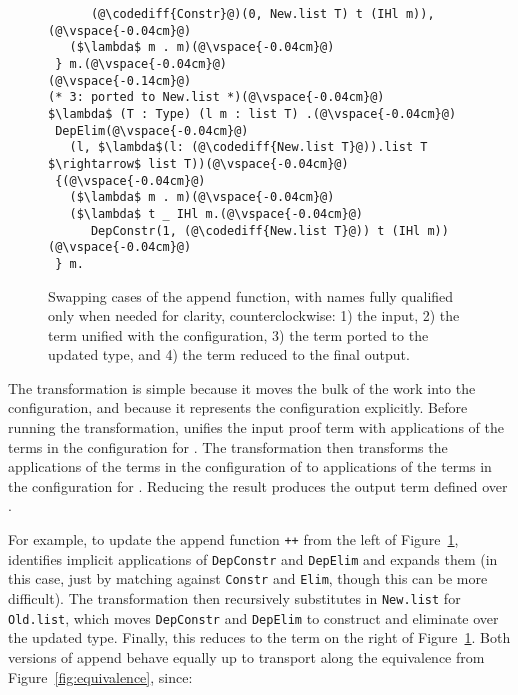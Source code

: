 \begin{figure}
\begin{minipage}{0.49\textwidth}
\begin{lstlisting}
      (@\codediff{Constr}@)(0, New.list T) t (IHl m)),(@\vspace{-0.04cm}@)
   ($\lambda$ m . m)(@\vspace{-0.04cm}@)
 } m.(@\vspace{-0.04cm}@)
(@\vspace{-0.14cm}@)
(* 3: ported to New.list *)(@\vspace{-0.04cm}@)
$\lambda$ (T : Type) (l m : list T) .(@\vspace{-0.04cm}@)
 DepElim(@\vspace{-0.04cm}@)
   (l, $\lambda$(l: (@\codediff{New.list T}@)).list T $\rightarrow$ list T))(@\vspace{-0.04cm}@)
 {(@\vspace{-0.04cm}@)
   ($\lambda$ m . m)(@\vspace{-0.04cm}@)
   ($\lambda$ t _ IHl m.(@\vspace{-0.04cm}@)
      DepConstr(1, (@\codediff{New.list T}@)) t (IHl m))(@\vspace{-0.04cm}@)
 } m.
\end{lstlisting}
\end{minipage}
\vspace{-0.3cm}
\caption{Swapping cases of the append function, with names fully qualified only when needed for clarity, counterclockwise: 1) the input, 2) the term unified with the configuration, 3) the term ported to the updated type, and 4) the term reduced to the final output.}
\label{fig:appswap1}
\end{figure}

The transformation is simple because it moves the bulk of the work into the configuration,
and because it represents the configuration explicitly.
Before running the transformation, \toolname unifies the input proof term with applications of the 
terms in the configuration for \A. The transformation then transforms the applications of the terms in the configuration of \A
to applications of the terms in the configuration for \B.
Reducing the result produces the output term defined over \B.

For example, to update the append function \lstinline{++} from the left of Figure~\ref{fig:appswap1}, \toolname
identifies implicit applications of \lstinline{DepConstr} and \lstinline{DepElim} and expands them (in this case,
just by matching against \lstinline{Constr} and \lstinline{Elim}, though this can be more difficult).
The transformation then recursively substitutes in \lstinline{New.list}
for \lstinline{Old.list}, which moves \lstinline{DepConstr} and \lstinline{DepElim}
to construct and eliminate over the updated type.
Finally, this reduces to the term on the right of Figure~\ref{fig:appswap1}.
Both versions of append behave equally up to transport along the equivalence from Figure~\ref{fig:equivalence}, since:


